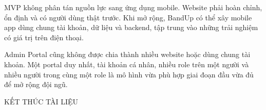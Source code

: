 \documentclass[11pt,a4paper]{article}
\begin{document}
MVP không phân tán nguồn lực sang ứng dụng mobile. Website phải hoàn chỉnh, ổn định và có người dùng thật trước. Khi mở rộng, BandUp có thể xây mobile app dùng chung tài khoản, dữ liệu và backend, tập trung vào những trải nghiệm có giá trị trên điện thoại.

Admin Portal cũng không được chia thành nhiều website hoặc dùng chung tài khoản. Một portal duy nhất, tài khoản cá nhân, nhiều role trên một người và nhiều người trong cùng một role là mô hình vừa phù hợp giai đoạn đầu vừa đủ để mở rộng đội ngũ.

\vfill
\begin{center}
\sffamily\color{BandGray} KẾT THÚC TÀI LIỆU
\end{center}
\end{document}
